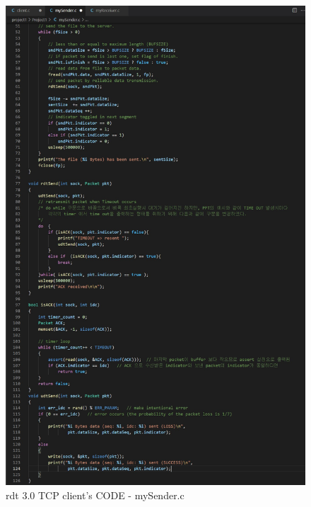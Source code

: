 \newpage
\vspace{0mm}
	\begin{figure}[!h]
		\centering
			\includegraphics[width=.9\textwidth]{image/code1-2.jpg}
			\caption{rdt 3.0 TCP client's CODE - mySender.c}
	\end{figure}
\vspace{-8mm}
\newpage
